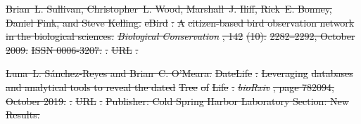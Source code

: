 \documentclass[oupdraft]{sysbio_sse}
\providecommand{\DIFdel}[1]{{\protect\color{red}\sout{#1}}}                      %
\providecommand{\DIFaddbegin}{} %
\providecommand{\DIFaddend}{} %
\providecommand{\DIFdelend}{} %
\begin{document}
\DIFdel{Brian~L. Sullivan, Christopher~L. Wood, Marshall~J. Iliff, Rick~E. Bonney,
  Daniel Fink, and Steve Kelling.
}%
\DIFdel{eBird}%
\DIFdel{: }%
\DIFdel{A}%
\DIFdel{citizen-based bird observation network in the biological
  sciences.
}%
\emph{\DIFdel{Biological Conservation}}%
\DIFdel{, 142}%
\DIFdel{(10):}%
\DIFdel{2282--2292, October 2009.
}%
\DIFdel{ISSN 0006-3207.
}%
\DIFdel{.
}%
\DIFdel{URL
  }%
\DIFdel{.
}%

\DIFdel{Luna~L. Sánchez-Reyes and Brian~C. O’Meara.
}%
\DIFdel{DateLife}%
\DIFdel{: }%
\DIFdel{Leveraging}%
\DIFdel{databases and analytical tools to reveal the
  dated }%
\DIFdel{Tree}%
\DIFdel{of }%
\DIFdel{Life}%
\DIFdel{.
}%
\emph{\DIFdel{bioRxiv}}%
\DIFdel{, page 782094, October 2019.
}%
\DIFdel{.
}%
\DIFdel{URL }%
\DIFdel{.
}%
\DIFdel{Publisher: Cold Spring Harbor Laboratory Section: New Results.
}%

\DIFdelend \DIFaddbegin 
\DIFaddend %





\end{document}

